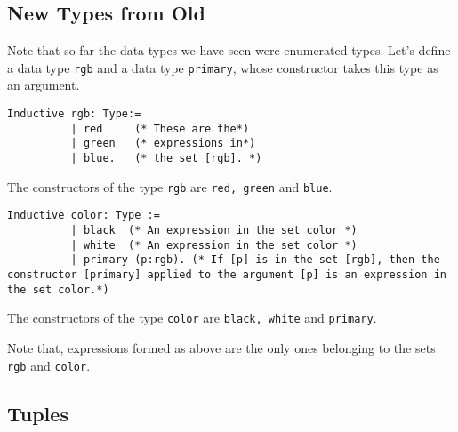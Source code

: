 	\subsection{New Types from Old}
	          
		 Note that so far the data-types we have seen were enumerated types.
		 Let's define a data type \lstinline!rgb! and a data type \lstinline!primary!, whose constructor takes this type as an argument.
		 
	    \begin{minipage}[t]{0.45\textwidth}
		\begin{lstlisting}[caption = \lstinline!rgb!]
		 Inductive rgb: Type:=
		  | red     (* These are the*)
		  | green   (* expressions in*)
		  | blue.   (* the set [rgb]. *)
		 \end{lstlisting}
		 The constructors of the type \lstinline!rgb! are \lstinline!red, green! and \lstinline!blue!. 
		 \end{minipage}
		 \hfill	 
		 \begin{minipage}[t]{0.45\textwidth}
		 \begin{lstlisting}[caption = \lstinline!color!]
		 Inductive color: Type := 
		  | black  (* An expression in the set color *)
		  | white  (* An expression in the set color *)
		  | primary (p:rgb). (* If [p] is in the set [rgb], then the constructor [primary] applied to the argument [p] is an expression in the set color.*) 
		 \end{lstlisting}
		 The constructors of the type \lstinline!color! are \lstinline!black, white! and \lstinline!primary!.\\
		 \end{minipage}	 	 
		 
		 Note that, expressions formed as above are the only ones belonging to the sets \lstinline!rgb! and \lstinline!color!.


		 
	\subsection{Tuples}
	
